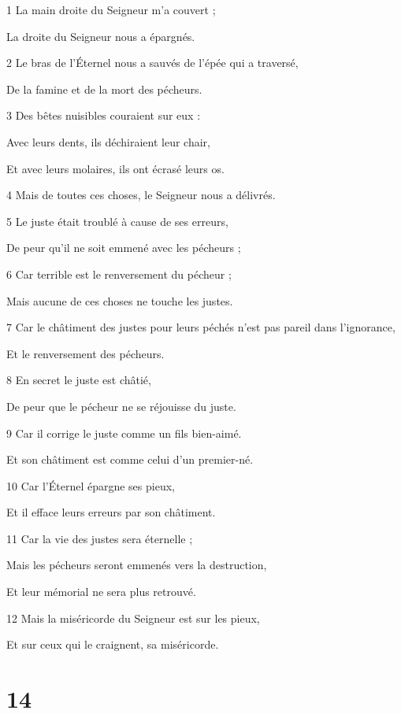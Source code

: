 \par 1 La main droite du Seigneur m'a couvert ;
\par     La droite du Seigneur nous a épargnés.
\par 2 Le bras de l'Éternel nous a sauvés de l'épée qui a traversé,
\par     De la famine et de la mort des pécheurs.
\par 3 Des bêtes nuisibles couraient sur eux :
\par     Avec leurs dents, ils déchiraient leur chair,
\par     Et avec leurs molaires, ils ont écrasé leurs os.
\par 4 Mais de toutes ces choses, le Seigneur nous a délivrés.
\par 5 Le juste était troublé à cause de ses erreurs,
\par     De peur qu'il ne soit emmené avec les pécheurs ;
\par 6 Car terrible est le renversement du pécheur ;
\par     Mais aucune de ces choses ne touche les justes.
\par 7 Car le châtiment des justes pour leurs péchés n'est pas pareil dans l'ignorance,
\par     Et le renversement des pécheurs.
\par 8 En secret le juste est châtié,
\par     De peur que le pécheur ne se réjouisse du juste.
\par 9 Car il corrige le juste comme un fils bien-aimé.
\par     Et son châtiment est comme celui d'un premier-né.
\par 10 Car l'Éternel épargne ses pieux,
\par     Et il efface leurs erreurs par son châtiment.
\par 11 Car la vie des justes sera éternelle ;
\par     Mais les pécheurs seront emmenés vers la destruction,
\par     Et leur mémorial ne sera plus retrouvé.
\par 12 Mais la miséricorde du Seigneur est sur les pieux,
\par     Et sur ceux qui le craignent, sa miséricorde.



\chapter{14}


